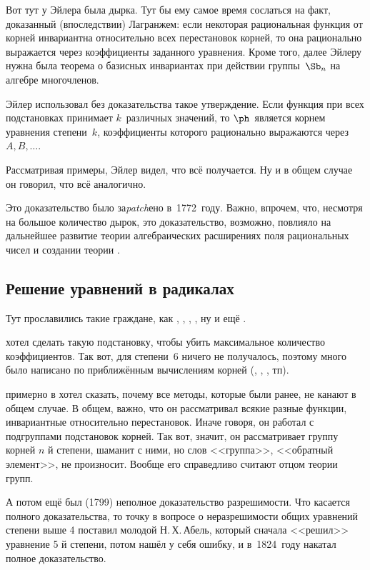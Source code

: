 \documentclass[a4paper,oneside,fleqn,10pt]{article}
\begin{document}
Вот тут у Эйлера была дырка. Тут бы ему самое время сослаться на факт, доказанный (впоследствии)
Лагранжем: если некоторая рациональная функция от корней инвариантна относительно всех перестановок корней,
то она рационально выражается через коэффициенты заданного уравнения.
Кроме того, далее Эйлеру нужна была теорема о базисных инвариантах при
действии группы~$\Sb_n$ на алгебре многочленов.

Эйлер использовал без доказательства такое утверждение.
Если функция при всех подстановках принимает $k$~различных значений, то $\ph$~является
корнем уравнения степени~$k$, коэффициенты которого рационально выражаются через $A, B, \dots$.

Рассматривая примеры, Эйлер видел, что всё получается. Ну и в общем случае он говорил,
что всё аналогично.

Это доказательство было за\emph{patch}ено  в~1772~году.
Важно, впрочем, что, несмотря на большое количество дырок, это доказательство,
возможно, повлияло на дальнейшее развитие теории алгебраических расширениях
поля рациональных чисел и создании теории .

\subsection{Решение уравнений в радикалах}

Тут прославились такие граждане, как , , , ,
ну и ещё .

 хотел сделать такую подстановку, чтобы убить максимальное количество коэффициентов.
Так вот, для степени~6 ничего не получалось, поэтому много было написано по
приближённым вычислениям корней (, , , тп).

 примерно в  хотел сказать, почему все методы, которые были ранее, не канают
в общем случае. В общем, важно, что он рассматривал всякие разные функции, инвариантные
относительно перестановок. Иначе говоря, он работал с подгруппами подстановок корней.
Так вот, значит, он рассматривает группу корней $n$ й степени, шаманит с ними,
но слов <<группа>>, <<обратный элемент>>, не произносит.
Вообще его справедливо считают отцом теории групп.

А потом ещё был  (1799) неполное доказательство разрешимости.
Что касается полного доказательства, то точку в вопросе о неразрешимости общих
уравнений степени выше 4 поставил молодой Н.\,Х.\,Абель, который сначала <<решил>>
уравнение 5 й степени, потом нашёл у себя ошибку, и в~1824~году накатал полное доказательство.
\end{document}
